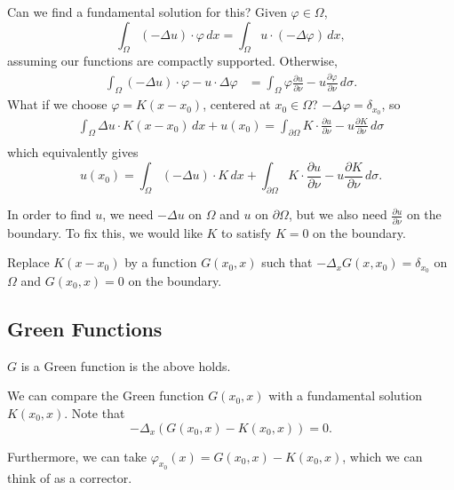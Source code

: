 \documentclass[12pt]{scrartcl}
\let \phi \varphi
\begin{document}
Can we find a fundamental solution for this?  Given $\phi \in \Omega$, 
$$\int_{\Omega}(-\Delta u) \cdot \phi \,dx = \int_{\Omega} u\cdot (-\Delta \phi)\,dx,$$
assuming our functions are compactly supported.  Otherwise,
\begin{align*}
\int_{\Omega}(-\Delta u) \cdot \phi - u \cdot \Delta \phi&= \int_{\Omega} \phi \frac{\partial u}{\partial \nu}- u \frac{\partial \phi}{\partial \nu} \,d\sigma.
\end{align*}
What if we choose $\phi = K(x - x_0)$, centered at $x_0 \in \Omega$?  $-\Delta \phi = \delta_{x_0}$, so 
\begin{align*}
\int_{\Omega} \Delta u \cdot K(x - x_0) \,dx + u(x_0) = \int_{\partial \Omega} K \cdot \frac{\partial u}{\partial \nu} - u \frac{\partial K}{\partial \nu} \, d\sigma \\
\end{align*}
which equivalently gives
$$u(x_0) = \int_\Omega (-\Delta u) \cdot K \,dx + \int_{\partial \Omega} K \cdot \frac{\partial u}{\partial \nu} - u \frac{\partial K}{\partial \nu} \, d\sigma.$$

In order to find $u$, we need $-\Delta u$  on $\Omega$ and $u$ on $\partial \Omega$, but we also need $\frac{\partial u}{\partial \nu}$ on the boundary.  To fix this, we would like $K$ to satisfy $K = 0$ on the boundary.  

Replace $K(x - x_0)$ by a function $G(x_0, x)$ such that $-\Delta_x G(x, x_0) = \delta_{x_0}$ on $\Omega$ and $G(x_0, x) = 0$ on the boundary.  
\subsection{Green Functions}
\begin{definition} $G$ is a Green function is the above holds.
\end{definition}
We can compare the Green function $G(x_0, x)$ with a fundamental solution $K(x_0, x)$.  Note that 
$$-\Delta_x(G(x_0, x) - K(x_0, x)) = 0.$$

Furthermore, we can take $\phi_{x_0}(x) = G(x_0, x) - K(x_0, x)$, which we can think of as a corrector.
\end{document}
